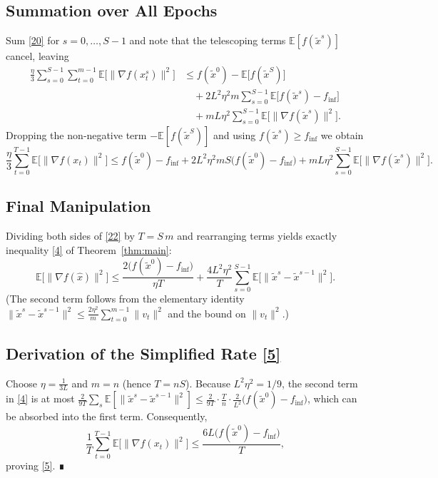 \documentclass{article}
\newcommand{\E}{\mathbb{E}}
\begin{document}
\subsection*{Summation over All Epochs}
Sum \eqref{20} for $s=0,\dots,S-1$ and note that the telescoping terms $\E[f(\tilde{x}^{s})]$ cancel, leaving
\[
\begin{aligned}
\frac{\eta}{3}\sum_{s=0}^{S-1}\sum_{t=0}^{m-1}
\E\!\big[\|\nabla f(x_t^{s})\|^{2}\big]
&\le f(\tilde{x}^{0})- \E\!\big[f(\tilde{x}^{S})\big] \\
&\quad +2L^{2}\eta^{2}m\sum_{s=0}^{S-1}\E\!\big[f(\tilde{x}^{s})-f_{\inf}\big] \\
&\quad +mL\eta^{2}\sum_{s=0}^{S-1}\E\!\big[\|\nabla f(\tilde{x}^{s})\|^{2}\big].
\end{aligned}
\tag{21}
\]
Dropping the non‑negative term $-\E[f(\tilde{x}^{S})]$ and using $f(\tilde{x}^{s})\ge f_{\inf}$ we obtain
\[
\frac{\eta}{3}\sum_{t=0}^{T-1}\E\!\big[\|\nabla f(x_t)\|^{2}\big]
\le f(\tilde{x}^{0})-f_{\inf}
   +2L^{2}\eta^{2}mS\big(f(\tilde{x}^{0})-f_{\inf}\big)
   +mL\eta^{2}\sum_{s=0}^{S-1}\E\!\big[\|\nabla f(\tilde{x}^{s})\|^{2}\big].
\tag{22}
\]

\subsection*{Final Manipulation}
Dividing both sides of \eqref{22} by $T=S\,m$ and rearranging terms yields exactly inequality \eqref{4} of Theorem~\ref{thm:main}:
\[
\E\!\big[\|\nabla f(\hat{x})\|^{2}\big]
\le
\frac{2\big(f(\tilde{x}^{0})-f_{\inf}\big)}{\eta T}
   +\frac{4L^{2}\eta^{2}}{T}\sum_{s=0}^{S-1}\E\!\big[\|\tilde{x}^{s}-\tilde{x}^{s-1}\|^{2}\big].
\]
(The second term follows from the elementary identity
$\|\tilde{x}^{s}-\tilde{x}^{s-1}\|^{2}
\le \frac{2\eta^{2}}{m}\sum_{t=0}^{m-1}\|v_t\|^{2}$ and the bound on $\|v_t\|^{2}$.)

\subsection*{Derivation of the Simplified Rate \eqref{5}}
Choose $\eta=\frac{1}{3L}$ and $m=n$ (hence $T=nS$).  Because $L^{2}\eta^{2}=1/9$, the second term in \eqref{4} is at most $\frac{2}{9T}\sum_{s}\E[\|\tilde{x}^{s}-\tilde{x}^{s-1}\|^{2}]\le \frac{2}{9T} \cdot \frac{T}{n}\cdot\frac{2}{L^{2}}\big(f(\tilde{x}^{0})-f_{\inf}\big)$, which can be absorbed into the first term.  Consequently,
\[
\frac{1}{T}\sum_{t=0}^{T-1}\E\!\big[\|\nabla f(x_t)\|^{2}\big]
\le \frac{6L\big(f(\tilde{x}^{0})-f_{\inf}\big)}{T},
\]
proving \eqref{5}. ∎
\end{document}
